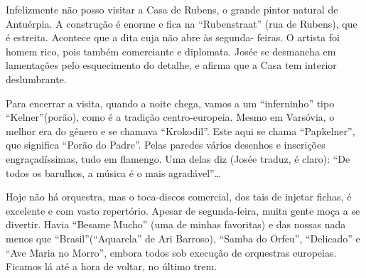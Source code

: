 Infelizmente não posso visitar a Casa de Rubens, o grande pintor natural de Antuérpia. A construção é enorme e fica na ``Rubenstraat'' (rua de Rubens), que é estreita. Acontece que a dita cuja não abre às segunda- feiras. O artista foi homem rico, pois também comerciante e diplomata. Josée se desmancha em lamentações pelo esquecimento do detalhe, e afirma que a Casa tem interior deslumbrante.

Para encerrar a visita, quando a noite chega, vamos a um ``inferninho'' tipo ``Kelner''(porão), como é a tradição centro-europeia. Mesmo em Varsóvia, o melhor era do gênero e se chamava ``Krokodil''. Este aqui se chama ``Papkelner'', que significa ``Porão do Padre''. Pelas paredes vários desenhos e inscrições engraçadíssimas, tudo em flamengo. Uma delas diz (Josée traduz, é claro): ``De todos os barulhos, a música é o mais agradável''\ldots

Hoje não há orquestra, mas o toca-discos comercial, dos tais de injetar fichas, é excelente e com vasto repertório. Apesar de segunda-feira, muita gente moça a se divertir. Havia ``Besame Mucho'' (uma de minhas favoritas) e das nossas nada menos que ``Brasil''(``Aquarela'' de Ari Barroso), ``Samba do Orfeu'', ``Delicado'' e ``Ave Maria no Morro'', embora todos sob execução de orquestras europeias. Ficamos lá até a hora de voltar, no último trem.
